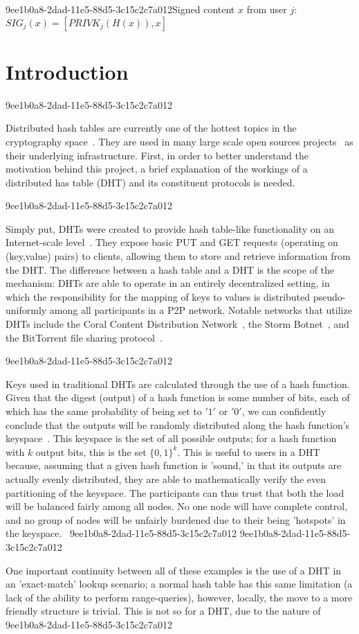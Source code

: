 \documentclass[12pt]{article}
\begin{document}
9ee1b0a8-2dad-11e5-88d5-3c15c2c7a012Signed content $x$ from user $j$: $SIG_j(x) = \left[ PRIVK_j( H(x) ), x \right]$

\section{Introduction}
9ee1b0a8-2dad-11e5-88d5-3c15c2c7a012\par Distributed hash tables are currently one of the hottest topics in the cryptography space~\cite{Stoica:2001dj,Rowstron:2001ea,Ratnasamy:2001wn}. They are used in many large scale open sources projects~\cite{Freitas:2013tb,Xu:2010vs,Perfitt:2010fh} as their underlying infrastructure. First, in order to better understand the motivation behind this project, a brief explanation of the workings of a distributed has table (DHT) and its constituent protocols is needed.

9ee1b0a8-2dad-11e5-88d5-3c15c2c7a012\par Simply put, DHTs were created to provide hash table-like functionality on an Internet-scale level~\cite{Ratnasamy:2001wn}. They expose basic PUT and GET requests (operating on (key,value) pairs) to clients, allowing them to store and retrieve information from the DHT. The difference between a hash table and a DHT is the scope of the mechanism: DHTs are able to operate in an entirely decentralized setting, in which the responsibility for the mapping of keys to values is distributed pseudo-uniformly among all participants in a P2P network. Notable networks that utilize DHTs include the Coral Content Distribution Network~\cite{Freedman:2004vb}, the Storm Botnet~\cite{Holz:2008uk}, and the BitTorrent file sharing protocol~\cite{Cohen:y1_8mBnw}.

9ee1b0a8-2dad-11e5-88d5-3c15c2c7a012\par Keys used in traditional DHTs are calculated through the use of a hash function. Given that the digest (output) of a hash function is some number of bits, each of which has the same probability of being set to $'1'$ or $'0'$, we can confidently conclude that the outputs will be randomly distributed along the hash function's keyspace~. This keyspace is the set of all possible outputs; for a hash function with $k$ output bits, this is the set $\{0,1\}^k$. This is useful to users in a DHT because, assuming that a given hash function is 'sound,' in that its outputs are actually evenly distributed, they are able to mathematically verify the even partitioning of the keyspace. The participants can thus trust that both the load will be balanced fairly among all nodes. No one node will have complete control, and no group of nodes will be unfairly burdened due to their being 'hotspots' in the keyspace.~
9ee1b0a8-2dad-11e5-88d5-3c15c2c7a012
9ee1b0a8-2dad-11e5-88d5-3c15c2c7a012\par One important continuity between all of these examples is the use of a DHT in an 'exact-match' lookup scenario; a normal hash table has this same limitation (a lack of the ability to perform range-queries), however, locally, the move to a more friendly structure is trivial. This is not so for a DHT, due to the nature of
\printbibliography
9ee1b0a8-2dad-11e5-88d5-3c15c2c7a012
\end{document}
